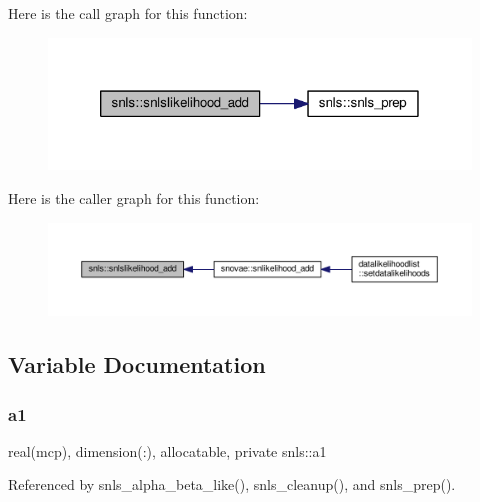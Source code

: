 Here is the call graph for this function\+:
\nopagebreak
\begin{figure}[H]
\begin{center}
\leavevmode
\includegraphics[width=320pt]{namespacesnls_a93456d40d3b103bc17faf5bafac66d76_cgraph}
\end{center}
\end{figure}
Here is the caller graph for this function\+:
\nopagebreak
\begin{figure}[H]
\begin{center}
\leavevmode
\includegraphics[width=350pt]{namespacesnls_a93456d40d3b103bc17faf5bafac66d76_icgraph}
\end{center}
\end{figure}


\subsection{Variable Documentation}
\mbox{\label{namespacesnls_a7a5b5ef85de03b3345f24e542dccf2fe}} 
\subsubsection{\texorpdfstring{a1}{a1}}
{\footnotesize\ttfamily real(mcp), dimension(\+:), allocatable, private snls\+::a1\hspace{0.3cm}{\ttfamily [private]}}



Referenced by snls\+\_\+alpha\+\_\+beta\+\_\+like(), snls\+\_\+cleanup(), and snls\+\_\+prep().

\mbox{\label{namespacesnls_a6472548375e64b614a5e7cae1b635b59}} 
